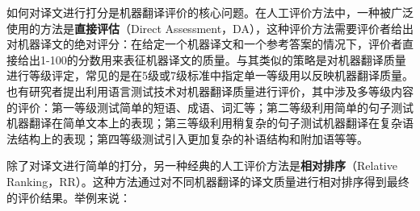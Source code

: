 \parinterval 如何对译文进行打分是机器翻译评价的核心问题。在人工评价方法中，一种被广泛使用的方法是{\small\sffamily\bfseries{直接评估}}（Direct Assessment，DA），这种评价方法需要评价者给出对机器译文的绝对评分：在给定一个机器译文和一个参考答案的情况下，评价者直接给出1-100的分数用来表征机器译文的质量。与其类似的策略是对机器翻译质量进行等级评定，常见的是在5级或7级标准中指定单一等级用以反映机器翻译质量。也有研究者提出利用语言测试技术对机器翻译质量进行评价，其中涉及多等级内容的评价：第一等级测试简单的短语、成语、词汇等；第二等级利用简单的句子测试机器翻译在简单文本上的表现；第三等级利用稍复杂的句子测试机器翻译在复杂语法结构上的表现；第四等级测试引入更加复杂的补语结构和附加语等等。

\parinterval 除了对译文进行简单的打分，另一种经典的人工评价方法是{\small\sffamily\bfseries{相对排序}}（Relative Ranking，RR）。这种方法通过对不同机器翻译的译文质量进行相对排序得到最终的评价结果。举例来说：

